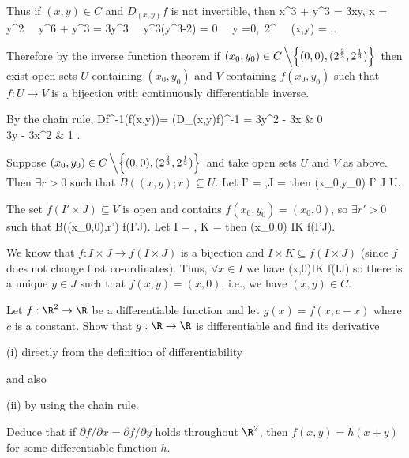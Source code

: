Thus if $(x,y)\in C$ and $D_{(x,y)}f$ is not invertible, then 
\be
x^3 + y^3 = 3xy, \quad x = y^2 \ \ra \ y^6 + y^3 = 3y^3 \ \ra \ y^3(y^3-2) = 0 \ \ra \ y =0,\ 2^{} \ \ra \ (x,y) = ,.
\ee

Therefore by the inverse function theorem if $(x_0,y_0)\in C \left\backslash \left\{(0, 0), (2^{\frac 23}, 2^{\frac 13})\right\}\right.$ then exist open sets $U$ containing $(x_0,y_0)$ and $V$ containing $f(x_0,y_0)$ such that $f:U\to V$ is a bijection with continuously differentiable inverse.

By the chain rule, 
\be
Df^{-1}(f(x,y))= (D_{(x,y)}f)^{-1} =  \bepm
3y^2 - 3x & 0\\
3y - 3x^2 & 1
\eepm.
\ee

Suppose $(x_0,y_0)\in C \left\backslash \left\{(0, 0), (2^{\frac 23}, 2^{\frac 13})\right\}\right.$ and take open sets $U$ and $V$ as above. Then $\exists r>0$ such that $B((x,y);r)\subseteq U$. Let
\be
I' = ,\quad\quad J = 
\ee  
then
\be
(x_0,y_0) \in I' \times J \subseteq U.
\ee

The set $f(I'\times J)\subseteq V$ is open and contains $f(x_0,y_0) = (x_0,0)$, so $\exists r'>0$ such that 
\be
B((x_0,0),r') \subseteq f(I'\times J).
\ee
Let
\be
I = , \quad\quad K = 
\ee
then
\be
(x_0,0) \in I\times K \subseteq f(I'\times J).
\ee

We know that $f: I\times J \to f(I\times J)$ is a bijection and $I\times K \subseteq f(I\times J)$ (since $f$ does not change first co-ordinates). Thus, $\forall x\in I$ we have
\be
(x,0)\in I\times K \subseteq f(I\times J)
\ee
so there is a unique $y\in J$ such that $f(x,y) = (x,0)$, i.e., we have $(x,y)\in C$.

\begin{exercise}
Let $f : \R^2 \to \R$ be a differentiable function and let $g(x) = f(x, c- x)$ where $c$ is a constant. Show that $g : \R \to \R$ is differentiable and find its derivative
\ben
\item [(i)] directly from the definition of differentiability

and also
\item [(ii)] by using the chain rule.
\een

Deduce that if $\partial f/\partial x = \partial f/\partial y$ holds throughout $\R^2$, then $f(x, y) = h(x + y)$ for some differentiable function $h$.
\end{exercise}

